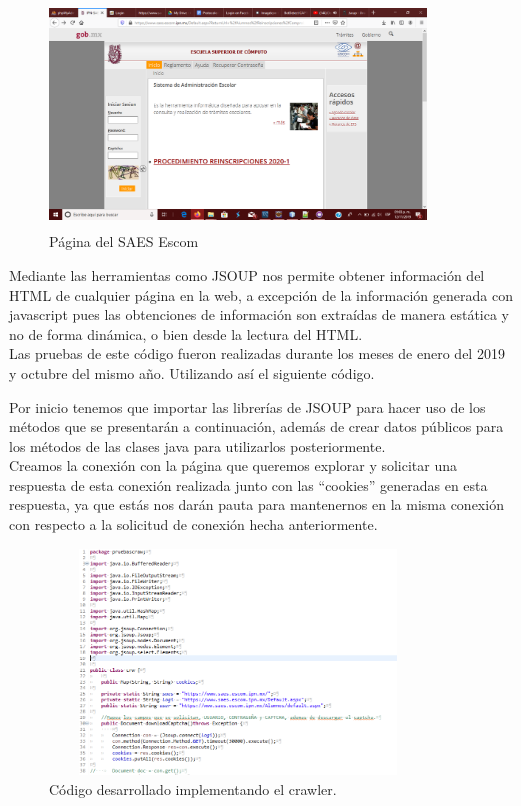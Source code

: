 	\begin{figure}[hbt!]
		\centering
		\includegraphics[width=10cm, height=6cm]{Imagenes/Crawler/SAES}
		\caption{Página del SAES Escom}
		\label{saes}
	\end{figure}
	
	\noindent Mediante las herramientas como JSOUP nos permite obtener información del HTML de cualquier página en la web, a excepción de la información generada con javascript pues las obtenciones de información son extraídas de manera estática y no de forma dinámica, o bien desde la lectura del HTML.\\
	\noindent Las pruebas de este código fueron realizadas durante los meses de enero del 2019 y octubre del mismo año. Utilizando así el siguiente código.
	\pagebreak
	
	\noindent Por inicio tenemos que importar las librerías de JSOUP para hacer uso de los métodos que se presentarán a continuación, además de crear datos públicos para los métodos de las clases java para utilizarlos posteriormente.\\
	\noindent Creamos la conexión con la página que queremos explorar y solicitar una respuesta de esta conexión realizada junto con las “cookies” generadas en esta respuesta, ya que estás nos darán pauta para mantenernos en la misma conexión con respecto a la solicitud de conexión hecha anteriormente. \\
	
	\begin{figure} [hbt!]
		\centering
		\includegraphics[width=10cm, height=6cm]{Imagenes/Crawler/Codigo1}
		\caption{Código desarrollado implementando el crawler.}
		\label{codigo1}
	\end{figure}
	
